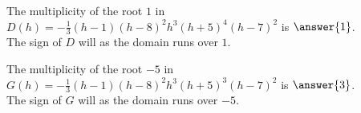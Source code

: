 \documentclass{ximera}
\begin{document}
\begin{exercise}
\begin{question}



The multiplicity of the root $1$ in $D(h) = -\frac{1}{3} (h - 1) (h - 8)^2 h^3 (h + 5)^4 (h - 7)^2$ is $\answer{1}$. \\


The sign of $D$ will  as the domain runs over $1$.




\end{question}












\begin{question}



The multiplicity of the root $-5$ in $G(h) = -\frac{1}{3} (h - 1) (h - 8)^2 h^3 (h + 5)^3 (h - 7)^2$ is $\answer{3}$. \\



The sign of $G$ will  as the domain runs over $-5$.




\end{question}








\end{exercise}
\end{document}
